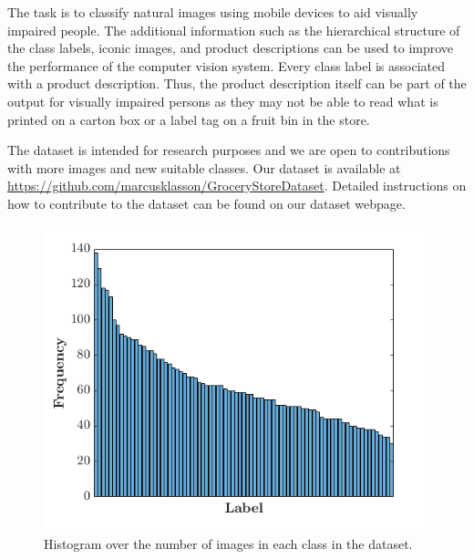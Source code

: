 The task is to classify natural images using mobile devices to aid visually impaired people. The additional information such as the hierarchical structure of the class labels, iconic images, and product descriptions can be used to improve the performance of the computer vision system. Every class label is associated with a product description. Thus, the product description itself can be part of the output for visually impaired persons as they may not be able to read what is printed on a carton box or a label tag on a fruit bin in the store.

The dataset is intended for research purposes and we are open to contributions with more images and new suitable classes. Our dataset is available at \url{https://github.com/marcusklasson/GroceryStoreDataset}. Detailed instructions on how to contribute to the dataset can be found on our dataset webpage.



\begin{figure}[t]
\centering
\includegraphics[width=\columnwidth,height=0.20\paperheight]{PaperA/figures/hist1_latex_bf14.png}
\caption{Histogram over the number of images in each class in the dataset.}
\label{fig:hist}
\end{figure}

